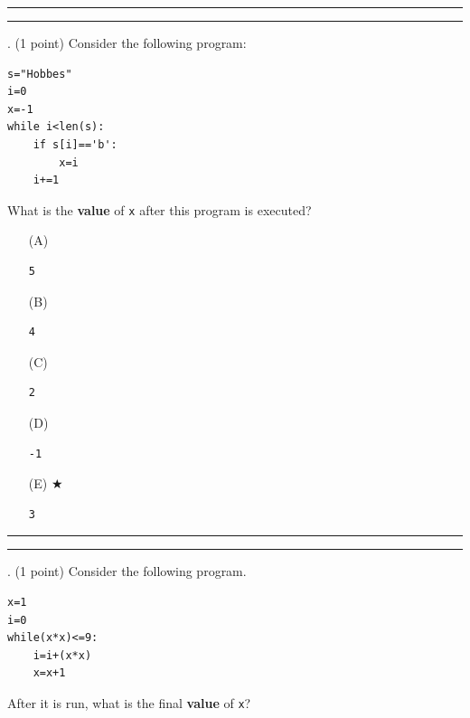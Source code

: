 \documentclass{article}
\begin{document}
\vspace*{2em}
\hrule
\vspace{2em}

\vspace{2em}
\hrule height 2pt


\newpage
{}. (1 point)
Consider the following program:
\begin{verbatim}
s="Hobbes"
i=0
x=-1
while i<len(s):
    if s[i]=='b':
        x=i
    i+=1
\end{verbatim}
What is the \textbf{value} of \texttt{x} after this program is executed?


\begin{enumerate}
\item[(A)]
\begin{verbatim}5\end{verbatim}

\item[(B)]
\begin{verbatim}4\end{verbatim}

\item[(C)]
\begin{verbatim}2\end{verbatim}

\item[(D)]
\begin{verbatim}-1\end{verbatim}

\item[(E)] $\bigstar$ 
\begin{verbatim}3\end{verbatim}

\end{enumerate}

\vspace*{2em}
\hrule
\vspace{2em}

\vspace{2em}
\hrule height 2pt


\newpage
{}. (1 point)
Consider the following program.
\begin{verbatim}
x=1
i=0
while(x*x)<=9:
    i=i+(x*x)
    x=x+1
\end{verbatim}
After it is run, what is the final \textbf{value} of \texttt{x}?
\end{document}
